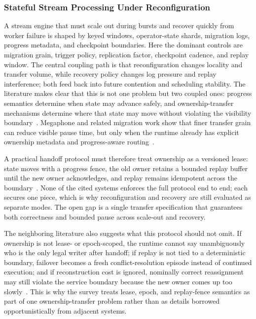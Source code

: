\documentclass[acmsmall,screen,review]{acmart}
\begin{document}
\subsubsection{Stateful Stream Processing Under Reconfiguration}

A stream engine that must scale out during bursts and recover quickly from worker failure is shaped by keyed windows, operator-state shards, migration logs, progress metadata, and checkpoint boundaries. Here the dominant controls are migration grain, trigger policy, replication factor, checkpoint cadence, and replay window. The central coupling path is that reconfiguration changes locality and transfer volume, while recovery policy changes log pressure and replay interference; both feed back into future contention and scheduling stability. The literature makes clear that this is not one problem but two coupled ones: progress semantics determine when state may advance safely, and ownership-transfer mechanisms determine where that state may move without violating the visibility boundary~\cite{akidau2013millwheel,murray2013naiad,carbone2015flink}. Megaphone and related migration work show that finer transfer grain can reduce visible pause time, but only when the runtime already has explicit ownership metadata and progress-aware routing~\cite{nasir2019megaphone,mao2025spacker}.

A practical handoff protocol must therefore treat ownership as a versioned lease: state moves with a progress fence, the old owner retains a bounded replay buffer until the new owner acknowledges, and replay remains idempotent across the boundary~\cite{nasir2019megaphone,mao2025spacker,carbone2015asynchronous,zhao2024recovery}. None of the cited systems enforces the full protocol end to end; each secures one piece, which is why reconfiguration and recovery are still evaluated as separate modes. The open gap is a single transfer specification that guarantees both correctness and bounded pause across scale-out and recovery.

The neighboring literature also suggests what this protocol should not omit. If ownership is not lease- or epoch-scoped, the runtime cannot say unambiguously who is the only legal writer after handoff; if replay is not tied to a deterministic boundary, failover becomes a fresh conflict-resolution episode instead of continued execution; and if reconstruction cost is ignored, nominally correct reassignment may still violate the service boundary because the new owner comes up too slowly~\cite{corbett2012spanner,thomson2012calvin,ongaro2014raft,ousterhout2011ramcloud}. This is why the survey treats lease, epoch, and replay-fence semantics as part of one ownership-transfer problem rather than as details borrowed opportunistically from adjacent systems.
\end{document}
